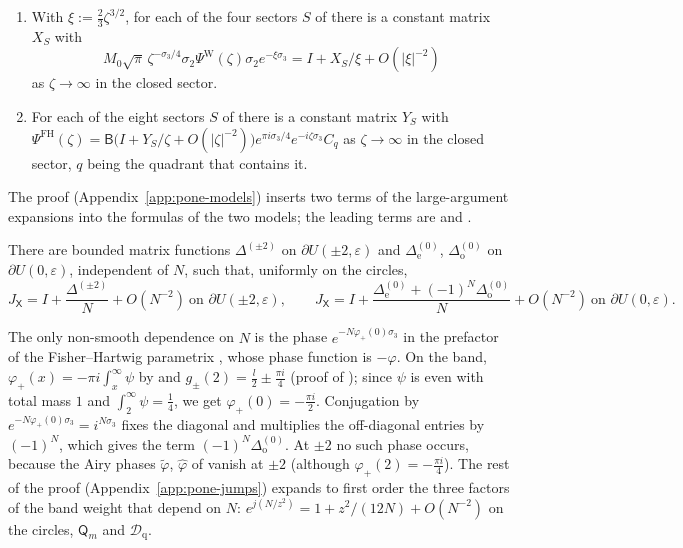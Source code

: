 \begin{lemma}\label{lem:pone-models}
\begin{enumerate}
\item[(a)] With $\xi:=\frac23\zeta^{3/2}$, for each of the four sectors $S$ of \cite[(6.8)]{WLXZ} there is a constant matrix
  $X_S$ with
  \[
    M_0\sqrt\pi\,\zeta^{-\sigma_3/4}\sigma_2\Psi^{\mathrm W}(\zeta)\sigma_2e^{-\xi\sigma_3}=I+X_S/\xi+O(|\xi|^{-2})
  \]
  as $\zeta\to\infty$ in the closed sector.
\item[(b)] For each of the eight sectors $S$ of \cite[\S4.2]{Van} there is a constant matrix $Y_S$ with
  $\Psi^{\mathrm{FH}}(\zeta)=\mathsf B\bigl(I+Y_S/\zeta+O(|\zeta|^{-2})\bigr)e^{\pi i\sigma_3/4}e^{-i\zeta\sigma_3}C_q$ as
  $\zeta\to\infty$ in the closed sector, $q$ being the quadrant that contains it.
\end{enumerate}
\end{lemma}

The proof (Appendix~\ref{app:pone-models}) inserts two terms of the large-argument expansions
\cite[(9.7.5)--(9.7.6), (10.17.5)--(10.17.6), (10.40.1)--(10.40.2)]{DLMF} into the formulas of the two models; the
leading terms are \cite[(6.13)]{WLXZ} and \cite[(4.43)--(4.46)]{Van}.

\begin{lemma}\label{lem:pone-jumps}
There are bounded matrix functions $\Delta^{(\pm2)}$ on $\partial U(\pm2,\varepsilon)$ and $\Delta^{(0)}_{\mathrm e}$,
$\Delta^{(0)}_{\mathrm o}$ on $\partial U(0,\varepsilon)$, independent of $N$, such that, uniformly on the circles,
\[
  J_{\mathsf X}=I+\frac{\Delta^{(\pm2)}}N+O(N^{-2})\ \text{on }\partial U(\pm2,\varepsilon),\qquad
  J_{\mathsf X}=I+\frac{\Delta^{(0)}_{\mathrm e}+(-1)^N\Delta^{(0)}_{\mathrm o}}N+O(N^{-2})\ \text{on }\partial U(0,\varepsilon).
\]
\end{lemma}

The only non-smooth dependence on $N$ is the phase $e^{-N\varphi_+(0)\sigma_3}$ in the prefactor of the Fisher--Hartwig
parametrix \cite[(5.26)]{KV}, whose phase function is $-\varphi$. On the band, $\varphi_+(x)=-\pi i\int_x^\infty\psi$ by \cite[(2.3), (4.3)]{WLXZ} and
$g_\pm(2)=\frac l2\pm\frac{\pi i}4$ (proof of \cite[Proposition~4.2]{WLXZ}); since $\psi$ is even with total mass $1$ and
$\int_2^\infty\psi=\frac14$, we get $\varphi_+(0)=-\frac{\pi i}2$. Conjugation by $e^{-N\varphi_+(0)\sigma_3}=i^{N\sigma_3}$
fixes the diagonal and multiplies the off-diagonal entries by $(-1)^N$, which gives the term $(-1)^N\Delta^{(0)}_{\mathrm o}$.
At $\pm2$ no such phase occurs, because the Airy phases $\tilde\varphi$, $\hat\varphi$ of \cite[(2.4), (4.28)]{WLXZ}
vanish at $\pm2$ (although $\varphi_+(2)=-\frac{\pi i}4$). The rest of the proof (Appendix~\ref{app:pone-jumps}) expands to
first order the three factors of the band weight that depend on $N$: $e^{j(N/z^2)}=1+z^2/(12N)+O(N^{-2})$ on the circles,
$\mathsf Q_m$ and $\mathcal D_{\mathrm q}$.

